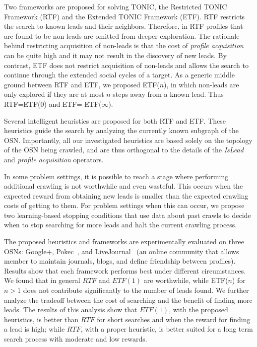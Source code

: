 \documentclass[journal]{IEEEtran}
\begin{document}
Two frameworks are proposed for solving TONIC, the Restricted TONIC Framework (RTF) and the Extended TONIC Framework (ETF). RTF restricts the search to known leads and their neighbors. Therefore, in RTF profiles that are found to be non-leads are omitted from deeper exploration. The rationale behind restricting acquisition of non-leads is that the cost of {\em profile acquisition} can be quite high and it may not result in the discovery of new leads. 
By contrast, ETF does not restrict acquisition of non-leads and allows the search to continue through the extended social cycles of a target. As a generic middle ground between RTF and ETF, we proposed ETF($n$), in which non-leads are only explored if they are at most $n$ steps away from a known lead. Thus RTF=ETF(0) and ETF= ETF($\infty$). 

Several intelligent heuristics are proposed for both RTF and ETF. These heuristics guide the search by analyzing the currently known subgraph of the OSN. Importantly, all our investigated heuristics are based solely on the topology of the OSN being crawled, and are thus orthogonal to the details of the {\em IsLead} and {\em profile acquisition} operators. 


In some problem settings, it is possible to reach a stage where performing additional crawling is not worthwhile and even wasteful. This occurs when the expected reward from obtaining new leads is smaller than the expected crawling costs of getting to them. For problem settings when this can occur, we propose two learning-based stopping conditions that use data about past crawls to decide when to stop searching for more leads and halt the current crawling process. 

The proposed heuristics and frameworks are experimentally evaluated on three OSNs: Google+, Pokec~\cite{takac2012data}, and LiveJournal~\cite{backstrom2006groupFormation,leskovec2009community} (an online community that allows member to maintain journals, blogs, and define friendship between profiles). Results show that each framework performs best under different circumstances. We found that in general \(RTF\) and \(ETF(1)\) are worthwhile, while  ETF($n$) for $n>1$ does not contribute significantly to the number of leads found. We further analyze the tradeoff between the cost of searching and the benefit of finding more leads. The results of this analysis show that \(ETF(1)\), with the proposed heuristics, is better than \(RTF\) for short searches and when the reward for finding a lead is high; while \(RTF\), with a proper heuristic, is better suited for a long term search process with moderate and low rewards. 
\end{document}
